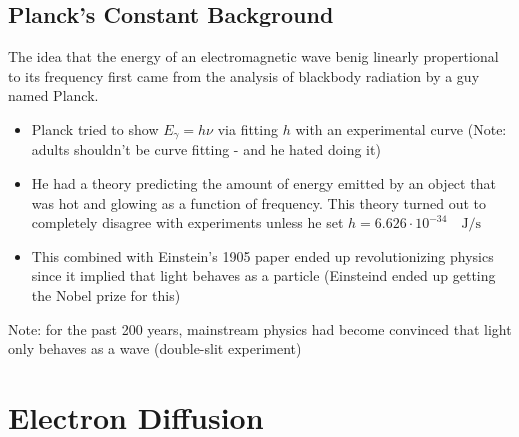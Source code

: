 \documentclass[a4paper]{article}
\begin{document}
\subsection*{Planck's Constant Background}
The idea that the energy of an electromagnetic wave benig linearly propertional to its frequency first came from the analysis of blackbody radiation by a guy named Planck. 
\begin{itemize}
    \item Planck tried to show $E_{\gamma}=h\nu$ via fitting $h$ with an experimental curve (Note: adults shouldn't be curve fitting - and he hated doing it) 
    \item He had a theory predicting the amount of energy emitted by an object that was hot and glowing as a function of frequency. This theory turned out to completely disagree with experiments unless he set $h=6.626\cdot 10^{-34} \quad \mathrm{J/s}$ 
    \item This combined with Einstein's 1905 paper ended up revolutionizing physics since it implied that light behaves as a particle (Einsteind ended up getting the Nobel prize for this) 
\end{itemize}
Note: for the past 200 years, mainstream physics had become convinced that light only behaves as a wave (double-slit experiment) 
\section{Electron Diffusion}
\end{document}
